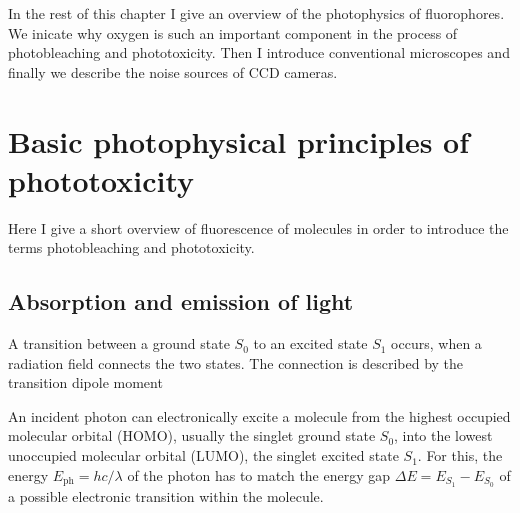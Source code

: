 In the rest of this chapter I give an overview of the photophysics of  
fluorophores. We inicate why oxygen is such an important component in
the process of photobleaching and phototoxicity.  Then I introduce
conventional microscopes and finally we describe the noise sources of
CCD cameras.




\section{Basic photophysical principles of phototoxicity}
\begin{summary}
  Here I give a short overview of fluorescence of molecules in order
  to introduce the terms photobleaching and phototoxicity.
\end{summary}

\newcommand{\vmu}{\mbox{\boldmath{$\mu$}}}
\subsection{Absorption and emission of light}
A transition between a ground state $S_0$ to an excited state $S_1$     
occurs, when a radiation field connects the two states. The connection
is described by the transition dipole moment

An incident photon can electronically excite a molecule from the
highest occupied molecular orbital (HOMO), usually the singlet ground
state $S_0$, into the lowest unoccupied molecular orbital (LUMO), the
singlet excited state $S_1$. For this, the energy $E_\textrm{ph}=hc/\lambda$ of the
photon has to match the energy gap $\Delta E=E_{S_1}-E_{S_0}$ of a
possible electronic transition within the molecule.

